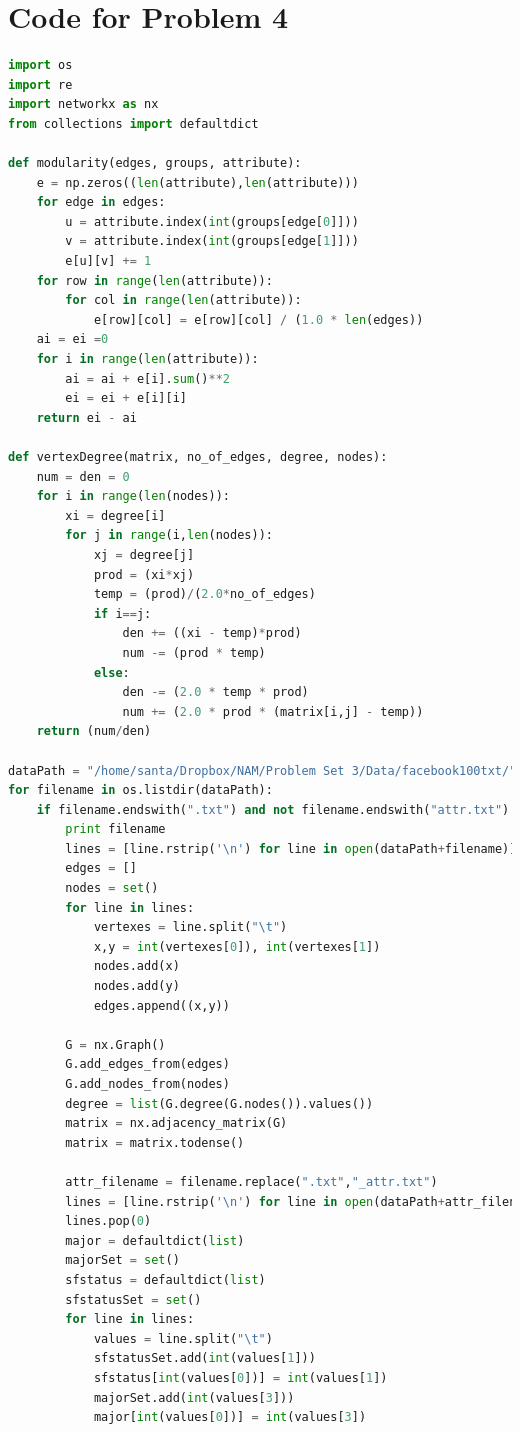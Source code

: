 \documentclass{article}
\begin{document}
\section*{Code for Problem 4}
\begin{lstlisting}[language=Python, breaklines=true]
import os
import re
import networkx as nx
from collections import defaultdict

def modularity(edges, groups, attribute):
    e = np.zeros((len(attribute),len(attribute)))
    for edge in edges:
        u = attribute.index(int(groups[edge[0]]))
        v = attribute.index(int(groups[edge[1]]))
        e[u][v] += 1
    for row in range(len(attribute)):
        for col in range(len(attribute)):
            e[row][col] = e[row][col] / (1.0 * len(edges))
    ai = ei =0
    for i in range(len(attribute)):
        ai = ai + e[i].sum()**2
        ei = ei + e[i][i]
    return ei - ai

def vertexDegree(matrix, no_of_edges, degree, nodes):
    num = den = 0
    for i in range(len(nodes)):
        xi = degree[i]
        for j in range(i,len(nodes)):
            xj = degree[j]
            prod = (xi*xj)
            temp = (prod)/(2.0*no_of_edges)
            if i==j:
                den += ((xi - temp)*prod)
                num -= (prod * temp)
            else:
                den -= (2.0 * temp * prod) 
                num += (2.0 * prod * (matrix[i,j] - temp))
    return (num/den)

dataPath = "/home/santa/Dropbox/NAM/Problem Set 3/Data/facebook100txt/"
for filename in os.listdir(dataPath):
    if filename.endswith(".txt") and not filename.endswith("attr.txt") and filename.find("readme") == -1:
        print filename
        lines = [line.rstrip('\n') for line in open(dataPath+filename)]
        edges = []
        nodes = set()
        for line in lines:
            vertexes = line.split("\t")
            x,y = int(vertexes[0]), int(vertexes[1])
            nodes.add(x)
            nodes.add(y)
            edges.append((x,y))
        
        G = nx.Graph()
        G.add_edges_from(edges)
        G.add_nodes_from(nodes)
        degree = list(G.degree(G.nodes()).values())
        matrix = nx.adjacency_matrix(G)
        matrix = matrix.todense()

        attr_filename = filename.replace(".txt","_attr.txt")
        lines = [line.rstrip('\n') for line in open(dataPath+attr_filename)]
        lines.pop(0)
        major = defaultdict(list)
        majorSet = set()
        sfstatus = defaultdict(list)
        sfstatusSet = set()
        for line in lines:
            values = line.split("\t")
            sfstatusSet.add(int(values[1]))
            sfstatus[int(values[0])] = int(values[1])
            majorSet.add(int(values[3]))
            major[int(values[0])] = int(values[3])
        

\end{lstlisting}
\end{document}
